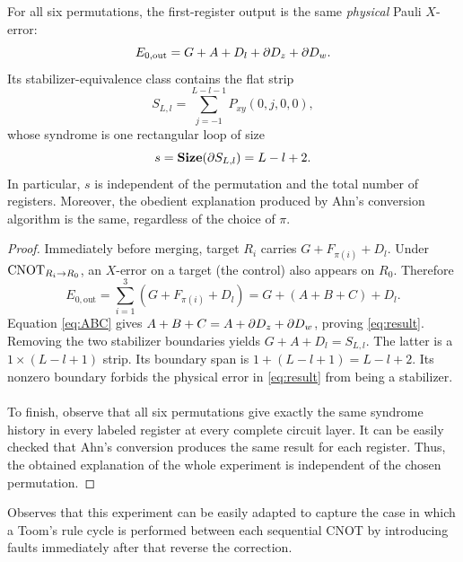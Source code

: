\documentclass[manuscript,screen,review]{acmart}
\begin{document}
\begin{proposition}\label{prop:three}
For all six permutations, the first-register output is the same \emph{physical} Pauli $X$-error:
\begin{equation}\label{eq:result}
 E_{0,\mathrm{out}}=G+A+D_l+\partial D_z+\partial D_w.
\end{equation}
Its stabilizer-equivalence class contains the flat strip
\[
 S_{L,l}=\sum_{j=-1}^{L-l-1}P_{xy}(0,j,0,0),
\]
whose syndrome is one rectangular loop of size
\begin{equation}\label{eq:s}
  s=\mathbf{Size}(\partial S_{L,l})=L-l+2.
\end{equation}
In particular, $s$ is independent of the permutation and the total number of registers. Moreover, the obedient explanation produced by Ahn's conversion algorithm is the same, regardless of the choice of $\pi$.
\end{proposition}
\begin{proof}
Immediately before merging, target $R_i$ carries $G+F_{\pi(i)}+D_l$. Under $\operatorname{CNOT}_{R_i\to R_0}$, an $X$-error on a target (the control) also appears on $R_0$. Therefore
\[
 E_{0,\mathrm{out}}=\sum_{i=1}^3(G+F_{\pi(i)}+D_l)
 =G+(A+B+C)+D_l.
\]
Equation \eqref{eq:ABC} gives $A+B+C=A+\partial D_z+\partial D_w$, proving \eqref{eq:result}. Removing the two stabilizer boundaries yields $G+A+D_l=S_{L,l}$. The latter is a $1\times (L-l+1)$ strip. Its boundary span is $1+(L-l+1)=L-l+2$. Its nonzero boundary forbids the physical error in \eqref{eq:result} from being a stabilizer.

\paragraph{}

To finish, observe that all six permutations give exactly the same syndrome history in every labeled register at every complete circuit layer. It can be easily checked that Ahn's conversion produces the same result for each register. Thus, the obtained explanation of the whole experiment is independent of the chosen permutation.

\end{proof}
Observes that this experiment can be easily adapted to capture the case in which a Toom's rule cycle is performed between each sequential CNOT by introducing faults immediately after that reverse the correction.
\end{document}
